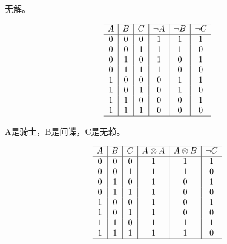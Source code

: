 {{        %
        \begin{practices}
            无解。

            \begin{table}[H]
                \[
                    \begin{array}{c|c|c|c|c|c}
                        \hline
                        A & B & C & \neg A & \neg B & \neg C \\
                        \hline
                        0 & 0 & 0 & 1 & 1 & 1 \\
                        0 & 0 & 1 & 1 & 1 & 0 \\
                        0 & 1 & 0 & 1 & 0 & 1 \\
                        0 & 1 & 1 & 1 & 0 & 0 \\
                        1 & 0 & 0 & 0 & 1 & 1 \\
                        1 & 0 & 1 & 0 & 1 & 0 \\
                        1 & 1 & 0 & 0 & 0 & 1 \\
                        1 & 1 & 1 & 0 & 0 & 0 \\
                        \hline
                   \end{array}
               \]
            \end{table}
        \end{practices}

        \begin{practices}
            A是骑士，B是间谍，C是无赖。

            \begin{table}[H]
                \[
                    \begin{array}{c|c|c|c|c|c}
                        \hline
                        A & B & C & A \otimes A & A \otimes B & \neg C \\
                        \hline
                        0 & 0 & 0 & 1 & 1 & 1 \\
                        0 & 0 & 1 & 1 & 1 & 0 \\
                        0 & 1 & 0 & 1 & 0 & 1 \\
                        0 & 1 & 1 & 1 & 0 & 0 \\
                        1 & 0 & 0 & 1 & 0 & 1 \\
                        1 & 0 & 1 & 1 & 0 & 0 \\
                        1 & 1 & 0 & 1 & 1 & 1 \\
                        1 & 1 & 1 & 1 & 1 & 0 \\
                        \hline
                   \end{array}
               \]
            \end{table}
        \end{practices}

}}
